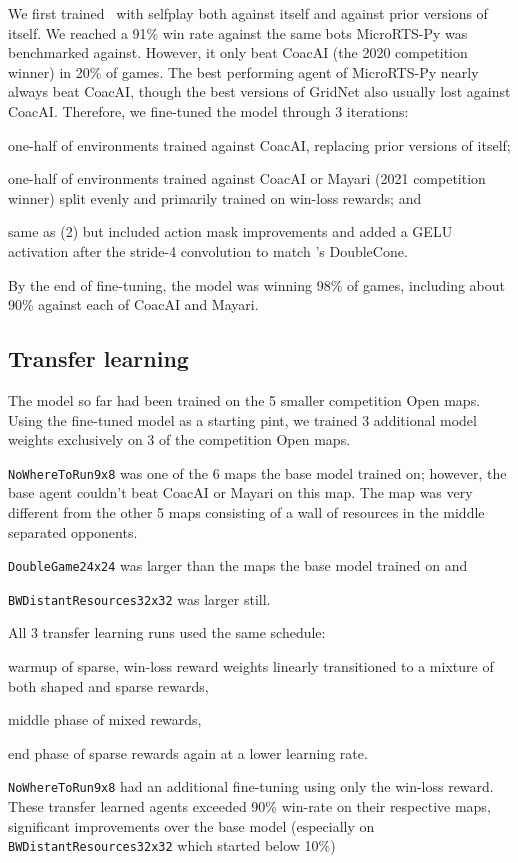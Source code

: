 \documentclass{article}
\begin{document}
We first trained \agentName\ with selfplay both against itself and against prior
versions of itself. We reached a 91\% win rate against the same bots MicroRTS-Py was
benchmarked against. However, it only beat CoacAI (the 2020 competition winner) in 20\%
of games. The best performing agent of MicroRTS-Py nearly always beat CoacAI, though
the best versions of GridNet also usually lost against CoacAI. Therefore, we fine-tuned
the model through 3 iterations:
\begin{inparaenum}[(1)]
    \item one-half of environments trained against CoacAI, replacing prior
    versions of itself;
    \item one-half of environments trained against CoacAI or Mayari (2021 competition
    winner) split evenly and primarily trained on win-loss rewards; and
    \item same as (2) but included action mask improvements and added a GELU activation
    after the stride-4 convolution to match \citet{Ferdinand2021doublecone}'s DoubleCone.
\end{inparaenum}
By the end of fine-tuning, the model was winning 98\% of games, including about 90\%
against each of CoacAI and Mayari.

\subsection{Transfer learning}
The model so far had been trained on the 5 smaller competition Open maps. Using the
fine-tuned model as a starting pint, we trained 3 additional model weights exclusively
on 3 of the competition Open maps.
\begin{inparaenum}[(1)]
    \item \texttt{NoWhereToRun9x8} was one of the 6 maps the base model trained on;
    however, the base agent couldn't beat CoacAI or Mayari on this map. The map was very
    different from the other 5 maps consisting of a wall of resources in the middle
    separated opponents.
    \item \texttt{DoubleGame24x24} was larger than the maps the base model trained on
    and
    \item \texttt{BWDistantResources32x32} was larger still.
\end{inparaenum}
All 3 transfer learning runs used the same schedule:
\begin{inparaenum}[(1)]
    \item warmup of sparse, win-loss reward weights linearly transitioned to a mixture
    of both shaped and sparse rewards,
    \item middle phase of mixed rewards,
    \item end phase of sparse rewards again at a lower learning rate.
\end{inparaenum}
\texttt{NoWhereToRun9x8} had an additional fine-tuning using only the win-loss reward.
These transfer learned agents exceeded 90\% win-rate on their respective maps,
significant improvements over the base model (especially on
\texttt{BWDistantResources32x32} which started below 10\%)
\end{document}
